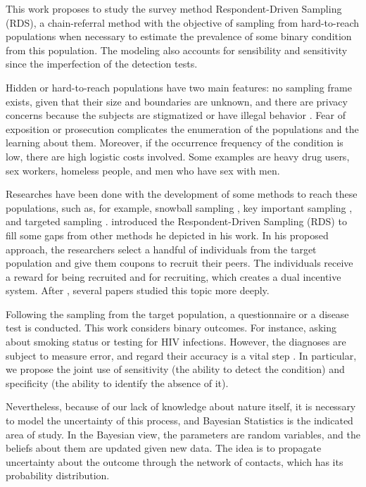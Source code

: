 This work proposes to study the survey method Respondent-Driven Sampling (RDS), a chain-referral method with the objective of sampling from hard-to-reach populations when necessary to estimate the prevalence of some binary condition from this population. The modeling also accounts for sensibility and sensitivity since the imperfection of the detection tests.  

Hidden or hard-to-reach populations have two main features: no sampling frame
exists, given that their size and boundaries are unknown, and there are
privacy concerns because the subjects are stigmatized or have illegal behavior
\cite{heckathorn1997}. Fear of exposition or prosecution complicates the
enumeration of the populations and the learning about them. Moreover, if the
occurrence frequency of the condition is low, there are high logistic costs
involved. Some examples are heavy drug users, sex workers, homeless people,
and men who have sex with men. 

Researches have been done with the development of some methods to reach these
populations, such as, for example, snowball sampling \cite{goodman1961}, key
important sampling \cite{deaux-callaghan1985}, 
and targeted sampling \cite{watters-biernacki1989}. \citeauthor{heckathorn1997} introduced the Respondent-Driven Sampling (RDS) to
fill some gaps from other methods he depicted in his work. In his proposed
approach, the researchers select a handful of individuals from the target
population and give them coupons to recruit their peers. The individuals
receive a reward for being recruited and for recruiting, which creates a dual
incentive system. After \citeyear{heckathorn1997}, several papers studied this
topic more deeply. 

Following the sampling from the target population, a questionnaire or a
disease test is conducted. This work considers binary outcomes. For
instance, asking about smoking status or testing for HIV infections. However,
the diagnoses are subject to measure error, and regard their accuracy is a
vital step \cite{reitsma2005bivariate}. In particular, we propose the joint
use of sensitivity (the ability to detect the condition) and specificity (the
ability to identify the absence of it).  

Nevertheless, because of our lack of knowledge about nature itself, it is
necessary to model the uncertainty of this process, and Bayesian Statistics is
the indicated area of study. In the Bayesian view, the parameters are random
variables, and the beliefs about them are updated given new data. The idea is
to propagate uncertainty about the outcome through the network of contacts,
which has its probability distribution.

